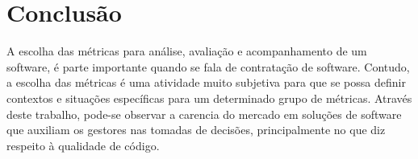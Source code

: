 \chapter[Conclusão]{Conclusão}
\label{sec:conclusão}
A escolha das métricas para análise, avaliação e acompanhamento de um software, é parte importante quando se fala de contratação de software. Contudo, a escolha das métricas é uma atividade muito subjetiva para que se possa definir contextos e situações específicas para um determinado grupo de métricas. 
Através deste trabalho, pode-se observar a carencia do mercado em soluções de software que auxiliam os gestores nas tomadas de decisões, principalmente no que diz respeito à qualidade de código.